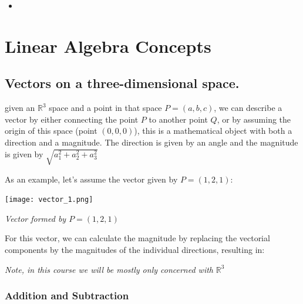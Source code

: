 \documentclass[11pt,fleqn]{book} %
\begin{document}
\begin{itemize}
    \item 
\end{itemize}

\vspace{20px}
\vspace{0.5cm} %


\chapter{Linear Algebra Concepts}
\section{Vectors on a three-dimensional space.}

given an $ \mathbb{R}^3 $ space and a point in that space $ P = (a,b,c) $,
we can describe a vector by either connecting the point $ P $ to another point $ Q $, or
by assuming the origin of this space (point $ (0,0,0) $), this is a mathematical object with both a
direction and a magnitude. The direction is given by an angle and the 
magnitude is given by $\sqrt{a_1^2 + a_2^2 + a_3^2}$

As an example, let's assume the vector given by $ P = (1,2,1) $:
\begin{center}
    \texttt{[image: vector\_1.png]}

    \textit{Vector formed by $ P = (1,2,1) $}
\end{center}

For this vector, we can calculate the magnitude by replacing the vectorial components by 
the magnitudes of the individual directions, resulting in:

%

\textit{Note, in this course we will be mostly only concerned with }$ \mathbb{R}^3 $
\subsection{Addition and Subtraction}
\end{document}

